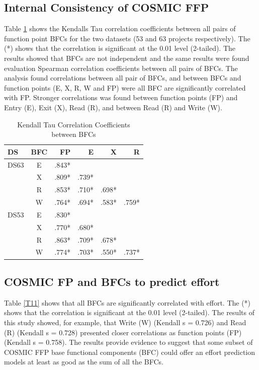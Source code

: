 \documentclass[conference]{IEEEtran}
\begin{document}
\subsection{Internal Consistency of COSMIC FFP}

Table \ref{T10} shows the Kendalls Tau correlation coefficients between all pairs of function point BFCs for the two datasets (53 and 63 projects respectively). The (*) shows that the correlation is significant at the 0.01 level (2-tailed). The results showed that BFCs are not independent and the same results were found evaluation Spearman correlation coefficients between all pairs of BFCs. The analysis found correlations between all pair of BFCs, and between BFCs and function points (E, X, R, W and FP) were all BFC are significantly correlated with FP. Stronger correlations was found between function points (FP) and Entry (E), Exit (X), Read (R), and between Read (R) and Write (W).

\begin{table}
\centering
\caption{Kendall Tau Correlation Coefficients between BFCs}
\label{T10}
\begin{tabular}{|l|c|r|r|r|r|}\hline
\textbf{DS} & \textbf{BFC} & \textbf{FP} & \textbf{E} & \textbf{X} & \textbf{R} \\\hline 
DS63 & E & .843* &       &       &       \\
   & X & .809* & .739* &       &       \\
   & R & .853* & .710* & .698* &       \\
   & W & .764* & .694* & .583* & .759* \\\hline
DS53 & E & .830* &       &       &       \\
   & X & .770* & .680* &       &       \\
   & R & .863* & .709* & .678* &       \\
   & W & .774* & .703* & .550* & .737* \\\hline       
\end{tabular}
\end{table}

\subsection{COSMIC FP and BFCs to predict effort}

Table \ref{T11} shows that all BFCs are significantly correlated with effort. The (*) shows that the correlation is significant at the 0.01 level (2-tailed). The results of this study showed, for example, that Write (W) (Kendall s = 0.726) and Read (R) (Kendall s = 0.728) presented closer correlations as function points (FP) (Kendall s = 0.758). The results provide evidence to suggest that some subset of COSMIC FFP base functional components (BFC) could offer an effort prediction models at least as good as the sum of all the BFCs.
\end{document}
